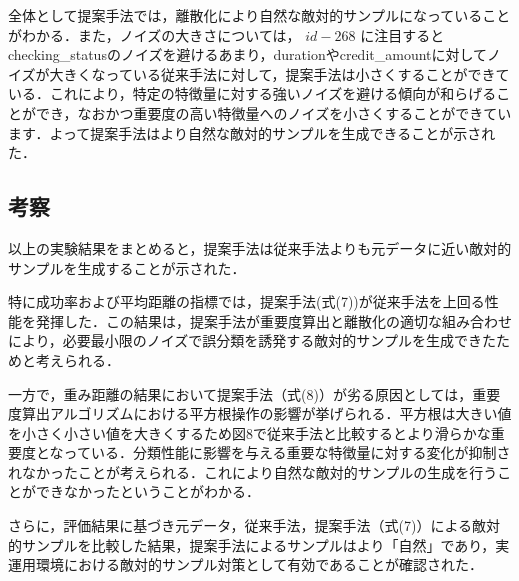 全体として提案手法では，離散化により自然な敵対的サンプルになっていることがわかる．また，ノイズの大きさについては， $id-268$ に注目するとchecking\_statusのノイズを避けるあまり，durationやcredit\_amountに対してノイズが大きくなっている従来手法に対して，提案手法は小さくすることができている．これにより，特定の特徴量に対する強いノイズを避ける傾向が和らげることができ，なおかつ重要度の高い特徴量へのノイズを小さくすることができています．よって提案手法はより自然な敵対的サンプルを生成できることが示された．

\subsection{考察}
以上の実験結果をまとめると，提案手法は従来手法よりも元データに近い敵対的サンプルを生成することが示された．

特に成功率および平均距離の指標では，提案手法(式(7))が従来手法を上回る性能を発揮した．この結果は，提案手法が重要度算出と離散化の適切な組み合わせにより，必要最小限のノイズで誤分類を誘発する敵対的サンプルを生成できたためと考えられる．

一方で，重み距離の結果において提案手法（式(8)）が劣る原因としては，重要度算出アルゴリズムにおける平方根操作の影響が挙げられる．平方根は大きい値を小さく小さい値を大きくするため図8で従来手法と比較するとより滑らかな重要度となっている．分類性能に影響を与える重要な特徴量に対する変化が抑制されなかったことが考えられる．これにより自然な敵対的サンプルの生成を行うことができなかったということがわかる．

さらに，評価結果に基づき元データ，従来手法，提案手法（式(7)）による敵対的サンプルを比較した結果，提案手法によるサンプルはより「自然」であり，実運用環境における敵対的サンプル対策として有効であることが確認された．

